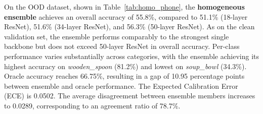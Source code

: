 On the OOD dataset, shown in Table~\ref{tab:homo_phone}, the \textbf{homogeneous ensemble} achieves an overall accuracy of 55.8\%, compared to 51.1\% (18-layer ResNet), 51.6\% (34-layer ResNet), and 56.3\% (50-layer ResNet). 
As on the clean validation set, the ensemble performs comparably to the strongest single backbone but does not exceed 50-layer ResNet in overall accuracy.
Per-class performance varies substantially across categories, with the ensemble achieving its highest accuracy on \textit{wooden\_spoon} (81.2\%) and lowest on \textit{soup\_bowl} (34.3\%).
Oracle accuracy reaches 66.75\%, resulting in a gap of 10.95 percentage points between ensemble and oracle performance. 
The Expected Calibration Error (ECE) is 0.0502.
The average disagreement between ensemble members increases to 0.0289, corresponding to an agreement ratio of 78.7\%.